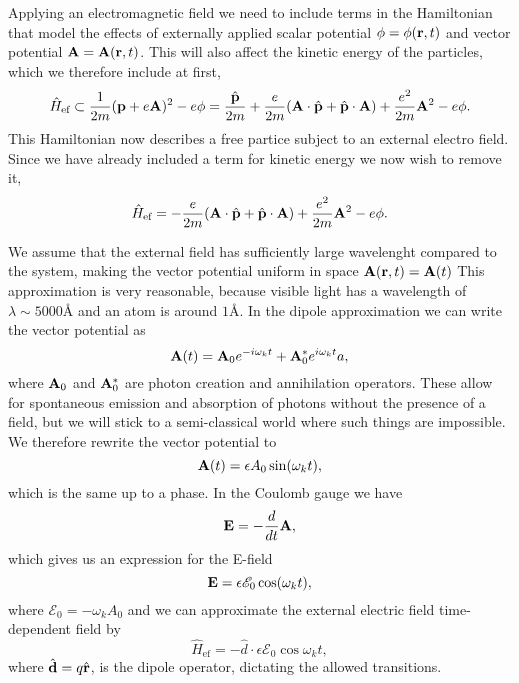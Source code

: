    Applying an electromagnetic field we need to include terms in the Hamiltonian that 
    model the effects of externally applied scalar potential $\phi = \phi(\vb{r}, t)$
    and vector potential $\vb{A} = \vb{A}(\vb{r}, t)$. This will also affect the 
    kinetic energy of the particles, which we therefore include at first,
    \begin{equation}
        \hat{H}_\text{ef} 
            \subset \frac{1}{2m}(\vb{p} + e \vb{A})^2 - e\phi
            = \frac{\hat{\vb{p}}}{2m} + \frac{e}{2m}(\vb{A}\cdot\hat{\vb{p}} + \hat{\vb{p}}\cdot\vb{A})
                + \frac{e^2}{2m}\vb{A}^2 - e\phi.
    \end{equation}
    This Hamiltonian now describes a free partice subject to an external 
    electro field. Since we have already included a term for kinetic energy we 
    now wish to remove it,
    \begin{equation}
        \hat{H}_\text{ef} 
            = - \frac{e}{2m}(\vb{A}\cdot\hat{\vb{p}} + \hat{\vb{p}}\cdot\vb{A})
                + \frac{e^2}{2m}\vb{A}^2 - e\phi.
    \end{equation}

    We assume that the external field has sufficiently large wavelenght compared to the 
    system, making the vector potential uniform in space $\vb{A}(\vb{r}, t) = \vb{A}(t)$
    This approximation is very reasonable, because visible light has a wavelength of 
    $\lambda \sim 5000 \text{Å}$ and an atom is around $1 \text{Å}$. In the dipole 
    approximation we can write the vector potential as 
    \begin{equation}
        \vb{A}(t) = \vb{A}_0e^{-i \omega_k t} + \vb{A}_0^*e^{i\omega_k t}a,
    \end{equation}
    where $\vb{A}_0$ and $\vb{A}_0^*$ are photon creation and annihilation operators. 
    These allow for spontaneous emission and absorption of photons without the presence 
    of a field, but we will stick to a semi-classical world where such things are 
    impossible. We therefore rewrite the vector potential to 
    \begin{equation}
        \vb{A}(t) = \epsilon A_0\sin(\omega_k t),
    \end{equation}
    which is the same up to a phase. In the Coulomb gauge we have 
    \begin{equation}
        \vb{E} = - \frac{d}{dt}\vb{A},
    \end{equation}
    which gives us an expression for the E-field 
    \begin{equation}
        \vb{E} = \epsilon \mathscr{E}_0 \cos(\omega_k t),
    \end{equation}
    where $\mathscr{E}_0 = -\omega_k A_0$ and we can approximate the external electric 
    field time-dependent field by 
    \begin{equation}
        \hat{H}_\text{ef} = - \hat{d} \cdot \epsilon \mathscr{E}_0 \cos{\omega_k t},
    \end{equation}
    where $\hat{\vb{d}} = q\hat{\vb{r}}$, is the dipole operator, dictating the 
    allowed transitions.

